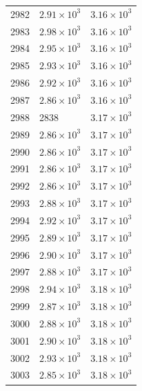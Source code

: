 \begin{table}[H]
\begin{tabular}{lll}
2982 & $\displaystyle 2.91 \times 10^{3}$ & $\displaystyle 3.16 \times 10^{3}$ \\
2983 & $\displaystyle 2.98 \times 10^{3}$ & $\displaystyle 3.16 \times 10^{3}$ \\
2984 & $\displaystyle 2.95 \times 10^{3}$ & $\displaystyle 3.16 \times 10^{3}$ \\
2985 & $\displaystyle 2.93 \times 10^{3}$ & $\displaystyle 3.16 \times 10^{3}$ \\
2986 & $\displaystyle 2.92 \times 10^{3}$ & $\displaystyle 3.16 \times 10^{3}$ \\
2987 & $\displaystyle 2.86 \times 10^{3}$ & $\displaystyle 3.16 \times 10^{3}$ \\
2988 & 2838 & $\displaystyle 3.17 \times 10^{3}$ \\
2989 & $\displaystyle 2.86 \times 10^{3}$ & $\displaystyle 3.17 \times 10^{3}$ \\
2990 & $\displaystyle 2.86 \times 10^{3}$ & $\displaystyle 3.17 \times 10^{3}$ \\
2991 & $\displaystyle 2.86 \times 10^{3}$ & $\displaystyle 3.17 \times 10^{3}$ \\
2992 & $\displaystyle 2.86 \times 10^{3}$ & $\displaystyle 3.17 \times 10^{3}$ \\
2993 & $\displaystyle 2.88 \times 10^{3}$ & $\displaystyle 3.17 \times 10^{3}$ \\
2994 & $\displaystyle 2.92 \times 10^{3}$ & $\displaystyle 3.17 \times 10^{3}$ \\
2995 & $\displaystyle 2.89 \times 10^{3}$ & $\displaystyle 3.17 \times 10^{3}$ \\
2996 & $\displaystyle 2.90 \times 10^{3}$ & $\displaystyle 3.17 \times 10^{3}$ \\
2997 & $\displaystyle 2.88 \times 10^{3}$ & $\displaystyle 3.17 \times 10^{3}$ \\
2998 & $\displaystyle 2.94 \times 10^{3}$ & $\displaystyle 3.18 \times 10^{3}$ \\
2999 & $\displaystyle 2.87 \times 10^{3}$ & $\displaystyle 3.18 \times 10^{3}$ \\
3000 & $\displaystyle 2.88 \times 10^{3}$ & $\displaystyle 3.18 \times 10^{3}$ \\
3001 & $\displaystyle 2.90 \times 10^{3}$ & $\displaystyle 3.18 \times 10^{3}$ \\
3002 & $\displaystyle 2.93 \times 10^{3}$ & $\displaystyle 3.18 \times 10^{3}$ \\
3003 & $\displaystyle 2.85 \times 10^{3}$ & $\displaystyle 3.18 \times 10^{3}$ \\

\end{tabular}
\end{table}
